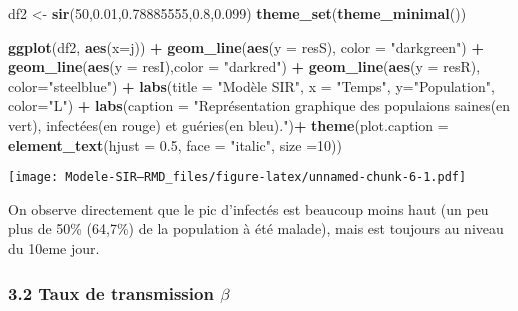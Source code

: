 \documentclass[
]{article}
\newenvironment{Shaded}{\begin{snugshade}}{\end{snugshade}}
\newcommand{\DataTypeTok}[1]{\textcolor[rgb]{0.13,0.29,0.53}{#1}}
\newcommand{\DecValTok}[1]{\textcolor[rgb]{0.00,0.00,0.81}{#1}}
\newcommand{\FloatTok}[1]{\textcolor[rgb]{0.00,0.00,0.81}{#1}}
\newcommand{\KeywordTok}[1]{\textcolor[rgb]{0.13,0.29,0.53}{\textbf{#1}}}
\newcommand{\NormalTok}[1]{#1}
\newcommand{\OperatorTok}[1]{\textcolor[rgb]{0.81,0.36,0.00}{\textbf{#1}}}
\newcommand{\StringTok}[1]{\textcolor[rgb]{0.31,0.60,0.02}{#1}}
\begin{document}
\begin{Shaded}
\begin{Highlighting}[]
\NormalTok{df2 <-}\StringTok{ }\KeywordTok{sir}\NormalTok{(}\DecValTok{50}\NormalTok{,}\FloatTok{0.01}\NormalTok{,}\FloatTok{0.78885555}\NormalTok{,}\FloatTok{0.8}\NormalTok{,}\FloatTok{0.099}\NormalTok{)}
\KeywordTok{theme_set}\NormalTok{(}\KeywordTok{theme_minimal}\NormalTok{())}

\KeywordTok{ggplot}\NormalTok{(df2, }\KeywordTok{aes}\NormalTok{(}\DataTypeTok{x=}\NormalTok{j)) }\OperatorTok{+}\StringTok{ }\KeywordTok{geom_line}\NormalTok{(}\KeywordTok{aes}\NormalTok{(}\DataTypeTok{y =}\NormalTok{ resS), }\DataTypeTok{color =} \StringTok{"darkgreen"}\NormalTok{) }\OperatorTok{+}\StringTok{ }\KeywordTok{geom_line}\NormalTok{(}\KeywordTok{aes}\NormalTok{(}\DataTypeTok{y =}\NormalTok{ resI),}\DataTypeTok{color =} \StringTok{"darkred"}\NormalTok{) }\OperatorTok{+}\StringTok{ }\KeywordTok{geom_line}\NormalTok{(}\KeywordTok{aes}\NormalTok{(}\DataTypeTok{y =}\NormalTok{ resR), }\DataTypeTok{color=}\StringTok{"steelblue"}\NormalTok{) }\OperatorTok{+}\StringTok{ }\KeywordTok{labs}\NormalTok{(}\DataTypeTok{title =} \StringTok{"Modèle SIR"}\NormalTok{, }\DataTypeTok{x =} \StringTok{"Temps"}\NormalTok{, }\DataTypeTok{y=}\StringTok{"Population"}\NormalTok{, }\DataTypeTok{color=}\StringTok{"L"}\NormalTok{) }\OperatorTok{+}\StringTok{ }\KeywordTok{labs}\NormalTok{(}\DataTypeTok{caption =} \StringTok{"Représentation graphique des populaions saines(en vert), infectées(en rouge) et guéries(en bleu)."}\NormalTok{)}\OperatorTok{+}\StringTok{ }\KeywordTok{theme}\NormalTok{(}\DataTypeTok{plot.caption =} \KeywordTok{element_text}\NormalTok{(}\DataTypeTok{hjust =} \FloatTok{0.5}\NormalTok{, }\DataTypeTok{face =} \StringTok{"italic"}\NormalTok{, }\DataTypeTok{size =}\DecValTok{10}\NormalTok{))}
\end{Highlighting}
\end{Shaded}

\texttt{[image: Modele-SIR---RMD\_files/figure-latex/unnamed-chunk-6-1.pdf]}

On observe directement que le pic d'infectés est beaucoup moins haut (un
peu plus de 50\% (64,7\%) de la population à été malade), mais est
toujours au niveau du 10eme jour.

\hypertarget{taux-de-transmission-beta}{%
\subsubsection{\texorpdfstring{3.2 Taux de transmission
\(\beta\)}{3.2 Taux de transmission \textbackslash beta}}\label{taux-de-transmission-beta}}
\end{document}

